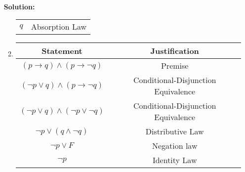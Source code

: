 \documentclass{article}
\newenvironment{solution} {
    \par
    \color{blue}
    \vspace{2mm}
    \hline \\
    \textbf{Solution:}
} {
    \vspace{2mm}
    \newpage
}
\begin{document}
\begin{enumerate}
\begin{solution}
\begin{enumerate}
\begin{tabular}{c|c}
        $q$ & Absorption Law\\
        \end{tabular}
        \item
        \begin{tabular}{c|c}
        Statement & Justification\\
        \hline
        $(p \rightarrow q) \wedge (p \rightarrow \lnot q)$ & Premise\\
        $(\neg p \lor q) \land (p \rightarrow \neg q)$ & Conditional-Disjunction Equivalence \\
        $(\neg p \lor q) \land (\neg p\lor \neg q )$ & Conditional-Disjunction Equivalence \\
        $\neg p \lor (q \land \neg q)$ & Distributive Law \\
        $\neg p \lor F$ & Negation law\\
        $\neg p$ & Identity Law\\
        \end{tabular}
    \end{enumerate}
    \end{solution}
    

\end{enumerate}
\end{document}
